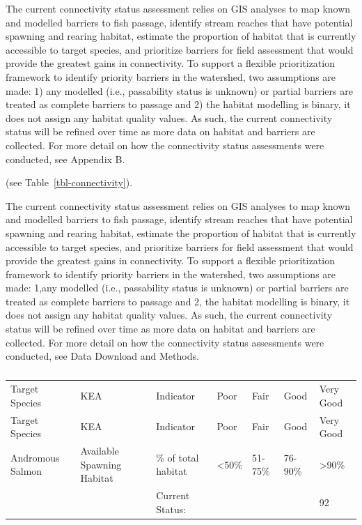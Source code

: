 \documentclass[
  letterpaper,
  DIV=11,
  numbers=noendperiod]{scrreprt}
\begin{document}
The current connectivity status assessment relies on GIS analyses to map
known and modelled barriers to fish passage, identify stream reaches
that have potential spawning and rearing habitat, estimate the
proportion of habitat that is currently accessible to target species,
and prioritize barriers for field assessment that would provide the
greatest gains in connectivity. To support a flexible prioritization
framework to identify priority barriers in the watershed, two
assumptions are made: 1) any modelled (i.e., passability status is
unknown) or partial barriers are treated as complete barriers to passage
and 2) the habitat modelling is binary, it does not assign any habitat
quality values. As such, the current connectivity status will be refined
over time as more data on habitat and barriers are collected. For more
detail on how the connectivity status assessments were conducted, see
Appendix B.

(see Table~\ref{tbl-connectivity}).

The current connectivity status assessment relies on GIS analyses to map
known and modelled barriers to fish passage, identify stream reaches
that have potential spawning and rearing habitat, estimate the
proportion of habitat that is currently accessible to target species,
and prioritize barriers for field assessment that would provide the
greatest gains in connectivity. To support a flexible prioritization
framework to identify priority barriers in the watershed, two
assumptions are made: 1,any modelled (i.e., passability status is
unknown) or partial barriers are treated as complete barriers to passage
and 2, the habitat modelling is binary, it does not assign any habitat
quality values. As such, the current connectivity status will be refined
over time as more data on habitat and barriers are collected. For more
detail on how the connectivity status assessments were conducted, see
Data Download and Methods.

\begin{longtable}[]{@{}lllllll@{}}

\caption{\label{tbl-connectivity}SAMPLE TABLE Connectivity status
assessment for spawning and rearing habitat.}

\tabularnewline

\caption{}\label{T_9a777}\tabularnewline
\toprule\noalign{}
Target Species & KEA & Indicator & Poor & Fair & Good & Very Good \\
\midrule\noalign{}
\endfirsthead
\toprule\noalign{}
Target Species & KEA & Indicator & Poor & Fair & Good & Very Good \\
\midrule\noalign{}
\endhead
\bottomrule\noalign{}
\endlastfoot
Andromous Salmon & Available Spawning Habitat & \% of total habitat &
\textless50\% & 51-75\% & 76-90\% & \textgreater90\% \\
& & Current Status: & & & & 92 \\

\end{longtable}
\end{document}
